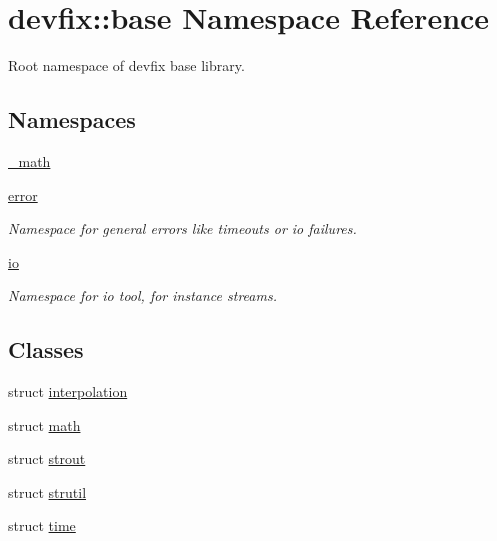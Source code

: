 \hypertarget{namespacedevfix_1_1base}{}\section{devfix\+:\+:base Namespace Reference}
\label{namespacedevfix_1_1base}


Root namespace of devfix base library.  


\subsection*{Namespaces}
\begin{DoxyCompactItemize}
\item 
 \hyperlink{namespacedevfix_1_1base_1_1__math}{\+\_\+math}
\item 
 \hyperlink{namespacedevfix_1_1base_1_1error}{error}
\begin{DoxyCompactList}\small\item\em Namespace for general errors like timeouts or io failures. \end{DoxyCompactList}\item 
 \hyperlink{namespacedevfix_1_1base_1_1io}{io}
\begin{DoxyCompactList}\small\item\em Namespace for io tool, for instance streams. \end{DoxyCompactList}\end{DoxyCompactItemize}
\subsection*{Classes}
\begin{DoxyCompactItemize}
\item 
struct \hyperlink{structdevfix_1_1base_1_1interpolation}{interpolation}
\item 
struct \hyperlink{structdevfix_1_1base_1_1math}{math}
\item 
struct \hyperlink{structdevfix_1_1base_1_1strout}{strout}
\item 
struct \hyperlink{structdevfix_1_1base_1_1strutil}{strutil}
\item 
struct \hyperlink{structdevfix_1_1base_1_1time}{time}
\end{DoxyCompactItemize}
